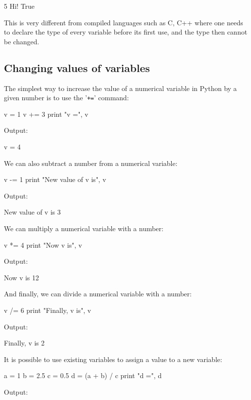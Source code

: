 \begin{bluecode}
5
Hi!
True
\end{bluecode}
This is very different from compiled languages such as C, C++ where one needs to declare the type 
of every variable before its first use, and the type then cannot be changed. 

\subsection{Changing values of variables}

The simplest way to increase the value of a numerical variable in Python by a given number 
is to use the '{\tt +=}' command:

\begin{bluecode}
v = 1
v += 3
print "v =", v
\end{bluecode}
Output:

\begin{bluecode}
v = 4
\end{bluecode}
We can also subtract a number from a numerical variable:

\begin{bluecode}
v -= 1
print "New value of v is", v
\end{bluecode}
Output:

\begin{bluecode}
New value of v is 3
\end{bluecode}
We can multiply a numerical variable with a number:

\begin{bluecode}
v *= 4
print "Now v is", v
\end{bluecode}
Output:

\begin{bluecode}
Now v is 12
\end{bluecode}
And finally, we can divide a numerical variable with a number:

\begin{bluecode}
v /= 6
print "Finally, v is", v
\end{bluecode}
Output:

\begin{bluecode}
Finally, v is 2
\end{bluecode}
It is possible to use existing variables to assign a value to a new variable:

\begin{bluecode}
a = 1
b = 2.5
c = 0.5
d = (a + b) / c
print "d =", d
\end{bluecode}
Output:

